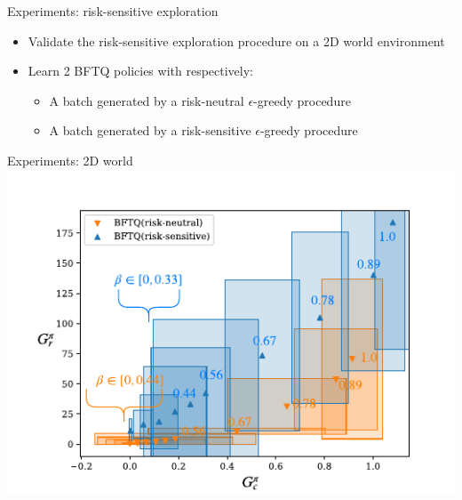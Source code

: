 \documentclass{beamer}
\begin{document}
    \begin{frame}{Experiments: risk-sensitive exploration}

        \begin{itemize}
            \item Validate the risk-sensitive exploration procedure on a 2D world environment
            \pause\item Learn 2 BFTQ policies with respectively:
            \begin{itemize}
                \item A batch generated by a risk-neutral $\epsilon$-greedy procedure
                \item A batch generated by a risk-sensitive $\epsilon$-greedy procedure
            \end{itemize}
        \end{itemize}
    \end{frame}

    \begin{frame}{Experiments: 2D world}
        \includegraphics[page=1, width=\textwidth]{img/corridors}
    \end{frame}
\end{document}

